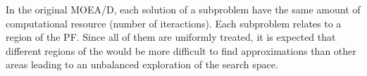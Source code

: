 In the original MOEA/D, each solution of a subproblem have the same amount of computational resource (number of iteractions). Each subproblem relates to a region of the PF. Since all of them are uniformly treated, it is expected that different regions of the would be more difficult to find approximations than other areas leading to an unbalanced exploration of the search space. 
%
%
%


%

